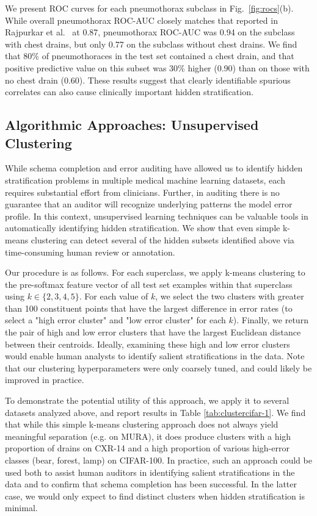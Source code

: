 \documentclass{article}
\begin{document}
We present ROC curves for each pneumothorax subclass in Fig.~\ref{fig:rocs}(b).  
While overall pneumothorax ROC-AUC closely matches that reported in Rajpurkar et al.~\citep{rajpurkar2017chexnet} at 0.87, pneumothorax ROC-AUC was 0.94 on the subclass with chest drains, but only 0.77 on the subclass without chest drains.  
We find that 80\% of pneumothoraces in the test set contained a chest drain, and that positive predictive value on this subset was 30\% higher (0.90) than on those with no chest drain (0.60).  
These results suggest that clearly identifiable spurious correlates can also cause clinically important hidden stratification.

\subsection{Algorithmic Approaches: Unsupervised Clustering}

While schema completion and error auditing have allowed us to identify hidden stratification problems in multiple medical machine learning datasets, each requires substantial effort from clinicians.
Further, in auditing there is no guarantee that an auditor will recognize underlying patterns the model error profile.
In this context, unsupervised learning techniques can be valuable tools in automatically identifying hidden stratification.
We show that even simple k-means clustering can detect several of the hidden subsets identified above via time-consuming human review or annotation.

Our procedure is as follows.  
For each superclass, we apply k-means clustering to the pre-softmax feature vector of all test set examples within that superclass using $k \in \{2,3,4,5\}$.
For each value of $k$, we select the two clusters with greater than 100 constituent points that have the largest difference in error rates (to select a "high error cluster" and "low error cluster" for each $k$).
Finally, we return the pair of high and low error clusters that have the largest Euclidean distance between their centroids.
Ideally, examining these high and low error clusters would enable human analysts to identify salient stratifications in the data.
Note that our clustering hyperparameters were only coarsely tuned, and could likely be improved in practice.

To demonstrate the potential utility of this approach, we apply it to several datasets analyzed above, and report results in Table \ref{tab:clustercifar-1}.  
We find that while this simple k-means clustering approach does not always yield meaningful separation (e.g. on MURA), it does produce clusters with a high proportion of drains on CXR-14 and a high proportion of various high-error classes (bear, forest, lamp) on CIFAR-100.  
 In practice, such an approach could be used both to assist human auditors in identifying salient stratifications in the data and to confirm that schema completion has been successful.
 In the latter case, we would only expect to find distinct clusters when hidden stratification is minimal.
\end{document}
